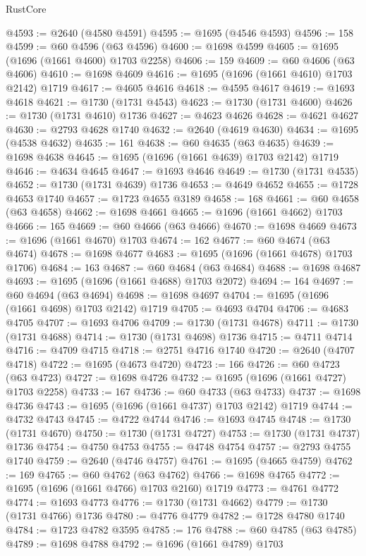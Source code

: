 \begin{lexlean}{RustCore}
\begin{coremodule}
@4593 := @2640 (@4580 @4591)
@4595 := @1695 (@4546 @4593)
@4596 := 158
@4599 := @60 @4596 (@63 @4596)
@4600 := @1698 @4599
@4605 := @1695 (@1696 (@1661 @4600) @1703 @2258)
@4606 := 159
@4609 := @60 @4606 (@63 @4606)
@4610 := @1698 @4609
@4616 := @1695 (@1696 (@1661 @4610) @1703 @2142) @1719
@4617 := @4605 @4616
@4618 := @4595 @4617
@4619 := @1693 @4618
@4621 := @1730 (@1731 @4543)
@4623 := @1730 (@1731 @4600)
@4626 := @1730 (@1731 @4610) @1736
@4627 := @4623 @4626
@4628 := @4621 @4627
@4630 := @2793 @4628 @1740
@4632 := @2640 (@4619 @4630)
@4634 := @1695 (@4538 @4632)
@4635 := 161
@4638 := @60 @4635 (@63 @4635)
@4639 := @1698 @4638
@4645 := @1695 (@1696 (@1661 @4639) @1703 @2142) @1719
@4646 := @4634 @4645
@4647 := @1693 @4646
@4649 := @1730 (@1731 @4535)
@4652 := @1730 (@1731 @4639) @1736
@4653 := @4649 @4652
@4655 := @1728 @4653 @1740
@4657 := @1723 @4655 @3189
@4658 := 168
@4661 := @60 @4658 (@63 @4658)
@4662 := @1698 @4661
@4665 := @1696 (@1661 @4662) @1703
@4666 := 165
@4669 := @60 @4666 (@63 @4666)
@4670 := @1698 @4669
@4673 := @1696 (@1661 @4670) @1703
@4674 := 162
@4677 := @60 @4674 (@63 @4674)
@4678 := @1698 @4677
@4683 := @1695 (@1696 (@1661 @4678) @1703 @1706)
@4684 := 163
@4687 := @60 @4684 (@63 @4684)
@4688 := @1698 @4687
@4693 := @1695 (@1696 (@1661 @4688) @1703 @2072)
@4694 := 164
@4697 := @60 @4694 (@63 @4694)
@4698 := @1698 @4697
@4704 := @1695 (@1696 (@1661 @4698) @1703 @2142) @1719
@4705 := @4693 @4704
@4706 := @4683 @4705
@4707 := @1693 @4706
@4709 := @1730 (@1731 @4678)
@4711 := @1730 (@1731 @4688)
@4714 := @1730 (@1731 @4698) @1736
@4715 := @4711 @4714
@4716 := @4709 @4715
@4718 := @2751 @4716 @1740
@4720 := @2640 (@4707 @4718)
@4722 := @1695 (@4673 @4720)
@4723 := 166
@4726 := @60 @4723 (@63 @4723)
@4727 := @1698 @4726
@4732 := @1695 (@1696 (@1661 @4727) @1703 @2258)
@4733 := 167
@4736 := @60 @4733 (@63 @4733)
@4737 := @1698 @4736
@4743 := @1695 (@1696 (@1661 @4737) @1703 @2142) @1719
@4744 := @4732 @4743
@4745 := @4722 @4744
@4746 := @1693 @4745
@4748 := @1730 (@1731 @4670)
@4750 := @1730 (@1731 @4727)
@4753 := @1730 (@1731 @4737) @1736
@4754 := @4750 @4753
@4755 := @4748 @4754
@4757 := @2793 @4755 @1740
@4759 := @2640 (@4746 @4757)
@4761 := @1695 (@4665 @4759)
@4762 := 169
@4765 := @60 @4762 (@63 @4762)
@4766 := @1698 @4765
@4772 := @1695 (@1696 (@1661 @4766) @1703 @2160) @1719
@4773 := @4761 @4772
@4774 := @1693 @4773
@4776 := @1730 (@1731 @4662)
@4779 := @1730 (@1731 @4766) @1736
@4780 := @4776 @4779
@4782 := @1728 @4780 @1740
@4784 := @1723 @4782 @3595
@4785 := 176
@4788 := @60 @4785 (@63 @4785)
@4789 := @1698 @4788
@4792 := @1696 (@1661 @4789) @1703

\end{coremodule}
\end{lexlean}
